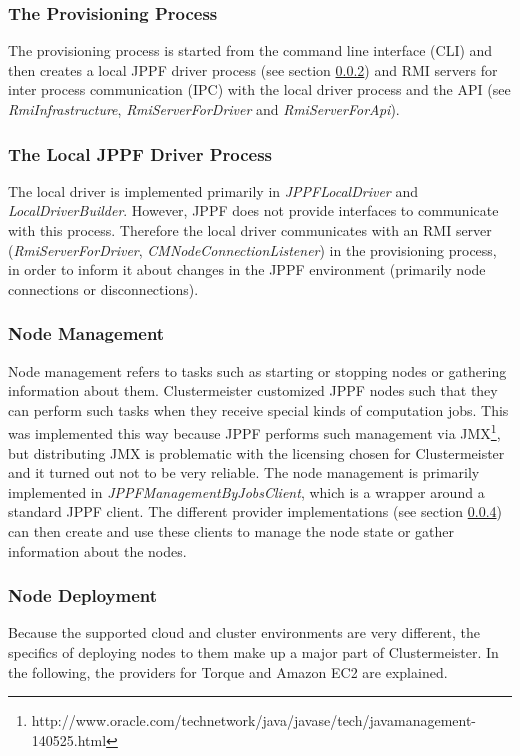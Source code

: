 \documentclass[english]{uzhpub}
\begin{document}
\subsubsection{The Provisioning Process}
The provisioning process is started from the command line interface (CLI) and then creates a local JPPF driver process (see section \ref{localdriver}) and RMI servers for inter process communication (IPC) with the local driver process and the API (see \textit{RmiInfrastructure}, \textit{RmiServerForDriver} and \textit{RmiServerForApi}).

\subsubsection{The Local JPPF Driver Process}
\label{localdriver}
The local driver is implemented primarily in \textit{JPPFLocalDriver} and \textit{LocalDriverBuilder}. However, JPPF does not provide interfaces to communicate with this process. Therefore the local driver communicates with an RMI server (\textit{RmiServerForDriver}, \textit{CMNodeConnectionListener}) in the provisioning process, in order to inform it about changes in the JPPF environment (primarily node connections or disconnections).

\subsubsection{Node Management}

Node management refers to tasks such as starting or stopping nodes or gathering information about them. Clustermeister customized JPPF nodes such that they can perform such tasks when they receive special kinds of computation jobs. This was implemented this way because JPPF performs such management via JMX\footnote{http://www.oracle.com/technetwork/java/javase/tech/javamanagement-140525.html}, but distributing JMX is problematic with the licensing chosen for Clustermeister and it turned out not to be very reliable. The node management is primarily implemented in \textit{JPPFManagementByJobsClient}, which is a wrapper around a standard JPPF client. The different provider implementations (see section \ref{deployment}) can then create and use these clients to manage the node state or gather information about the nodes.

\subsubsection{Node Deployment}
\label{deployment}
Because the supported cloud and cluster environments are very different, the specifics of deploying nodes to them make up a major part of Clustermeister. In the following, the providers for Torque and Amazon EC2 are explained. 
\end{document}
